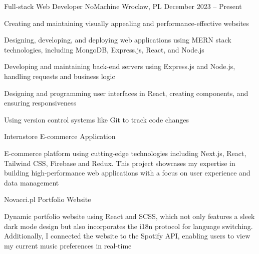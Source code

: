 \documentclass[]{awesome-cv}
\begin{document}
\vspace{-5mm}
\begin{cventries}
  \cventry
  {Full-stack Web Developer}
  {NoMachine}
  {Wroclaw, PL}
  {December 2023 – Present}
  {\begin{cvitems}
    \item {Creating and maintaining visually appealing and performance-effective websites}
    \item {Designing, developing, and deploying web applications using MERN stack technologies, including MongoDB, Express.js, React, and Node.js}
    \item {Developing and maintaining back-end servers using Express.js and Node.js, handling requests and business logic}
    \item {Designing and programming user interfaces in React, creating components, and ensuring responsiveness}
    \item {Using version control systems like Git to track code changes}
    \end{cvitems}}
	\cventry
{Internstore}
  {E-commerce Application}
  {}
  {}
  {\begin{cvitems}
    \item {E-commerce platform using cutting-edge technologies including Next.js, React, Tailwind CSS, Firebase and Redux. This project showcases my expertise in building high-performance web applications with a focus on user experience and data management}
    \end{cvitems}}
	\cventry
{Novacci.pl}
  {Portfolio Website}
  {}
  {}
  {\begin{cvitems}
    \item {Dynamic portfolio website using React and SCSS, which not only features a sleek dark mode design but also incorporates the i18n protocol for language switching. Additionally, I connected the website to the Spotify API, enabling users to view my current music preferences in real-time}
    \end{cvitems}}
\end{cventries}
\vspace{-5mm}
\end{document}
